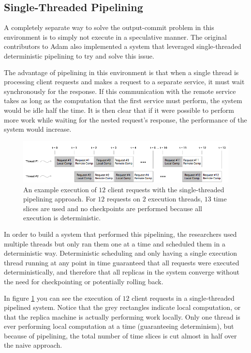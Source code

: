 \documentclass[11pt, oneside]{report}
\begin{document}
\subsection{Single-Threaded Pipelining}\label{STP}

A completely separate way to solve the output-commit problem in this environment is to simply not execute in a speculative manner. 
The original contributors to Adam also implemented a system that leveraged single-threaded deterministic pipelining to try and solve this issue.

The advantage of pipelining in this environment is that when a single thread is processing client requests and makes a request to a separate service, it must wait synchronously for the response. 
If this communication with the remote service takes as long as the computation that the first service must perform, the system would be idle half the time.
It is then clear that if it were possible to perform more work while waiting for the nested request's response, the performance of the system would increase.

\begin{figure}[h]
\centering
\includegraphics[width=1.0\textwidth]{SequentialPipelined.png}
\caption{\label{seqpipe}An example execution of $12$ client requests with the single-threaded pipelining approach. For $12$ requests on $2$ execution threads, $13$ time slices are used and no checkpoints are performed because all execution is deterministic.}
\end{figure}

In order to build a system that performed this pipelining, the researchers used multiple threads but only ran them one at a time and scheduled them in a deterministic way. 
Deterministic scheduling and only having a single execution thread running at any point in time guaranteed that all requests were executed deterministically, and therefore that all replicas in the system converge without the need for checkpointing or potentially rolling back.

In figure \ref{seqpipe} you can see the execution of $12$ client requests in a single-threaded pipelined system. Notice that the grey rectangles indicate local computation, or that the replica machine is actually performing work locally. Only one thread is ever performing local computation at a time (guaranteeing determinism), but because of pipelining, the total number of time slices is cut almost in half over the naive approach.
\end{document}
